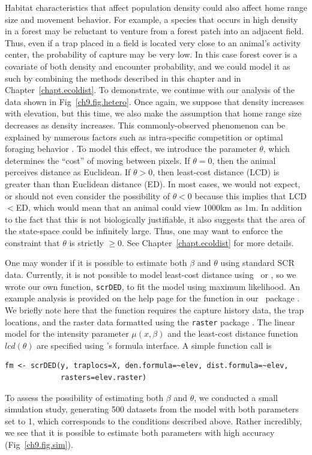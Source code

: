 Habitat characteristics that affect population
density could also affect home range size and movement behavior. For
example, a
species that occurs in high density in a forest may be reluctant to
venture from a forest patch into an adjacent field. Thus, even if a
trap placed in a field is located very close to an animal's activity
center, the probability of capture may be very low. In this case
forest cover is a covariate of both density and encounter probability,
and we could model it as such by combining the methods described in
this chapter and in Chapter~\ref{chapt.ecoldist}. To demonstrate, we
continue with our analysis of the data shown in
Fig~\ref{ch9.fig.hetero}. Once again, we suppose that density
increases with elevation, but this time, we also make the
assumption that home range size decreases as density increases. This
commonly-observed phenomenon can be explained by numerous factors such
as intra-specific competition \citep{sillett_etal:2004} or optimal
foraging behavior \citep{tufto_etal:1996,said_servanty:2005}. To model
this effect, we
introduce the parameter $\theta$, which determines the ``cost'' of
moving between pixels. If $\theta=0$, then the animal perceives
distance as Euclidean. If $\theta>0$, then least-cost distance (LCD)
is greater than than Euclidean distance (ED). In most cases, we would
not expect,
or should not even consider the possibility of $\theta<0$ because this
implies that LCD$<$ED, which would mean that an animal could view
1000km as 1m. In addition to the fact that this is not biologically
justifiable, it also suggests that the area of the state-space could
be infinitely large. Thus, one may want to enforce the constraint that
$\theta$ is strictly $\geq 0$. See Chapter~\ref{chapt.ecoldist} for
more details.

One may wonder if it is possible to estimate both $\beta$
and $\theta$ using standard SCR data. Currently, it is not possible to
model least-cost distance using \jags~or \secr, so we wrote our own
function, \verb+scrDED+, to fit the model using maximum likelihood. An
example analysis is provided on the help page for the function in our
\R~package \scrbook. We briefly note here that the function requires
the capture history data, the trap locations, and the raster data
formatted using the {\tt raster} package
\citep{hijmans_vanetten:2012}. The linear model for the
intensity parameter $\mu(x, \beta)$ and the least-cost distance
function $lcd(\theta)$ are specified using \R's formula interface. A
simple function call is
\begin{verbatim}
fm <- scrDED(y, traplocs=X, den.formula=~elev, dist.formula=~elev,
             rasters=elev.raster)
\end{verbatim}
To assess the possibility of estimating both $\beta$ and $\theta$, we
conducted a small simulation study, generating 500 datasets from the
model with both parameters set to 1, which corresponds to the
conditions described above. Rather incredibly, we see that it is
possible to estimate both parameters with high accuracy
(Fig~\ref{ch9.fig.sim}).

